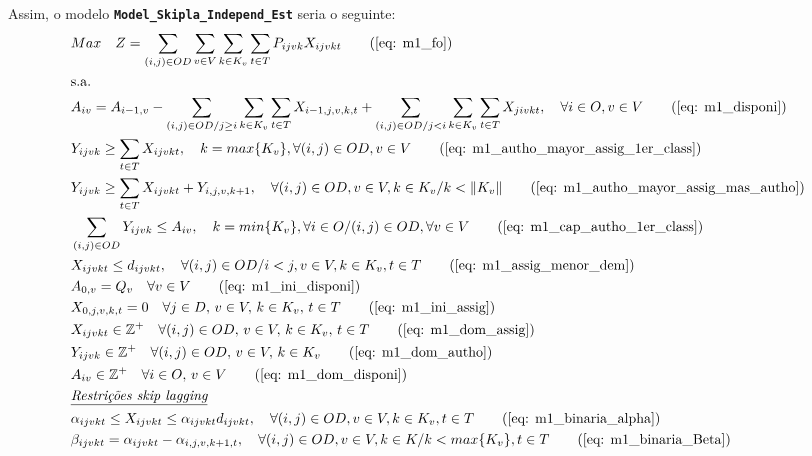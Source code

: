 Assim, o modelo \textbf{ \texttt{Model\_Skipla\_Independ\_Est}} seria o seguinte:
\allowdisplaybreaks
\begin{align}
	& Max \quad Z = \sum_{(i,j)\in OD} \sum_{v\in V} \sum_{k\in K_v} \sum_{t\in T} P_{ijvk} X_{ijvkt}     \tag{\ref{eq: m1_fo}}   \\
	& \text{s.a.}  \notag \\
	& A_{iv} = A_{i-1,v} - \sum_{(i,j) \in OD/j \geq i} \sum_{k\in K_v}\sum_{t\in T}X_{i-1,j,v,k,t} + \sum_{(i,j) \in OD/j<i} \sum_{k\in K_v}\sum_{t\in T}X_{jivkt}, \quad \forall i \in O, v \in V   \tag{\ref{eq: m1_disponi}} \\
	& Y_{ijvk} \geq  \sum_{t \in T} X_{ijvkt},  \quad k = max\{K_v\}, \forall(i,j) \in OD ,v \in V     \tag{\ref{eq: m1_autho_mayor_assig_1er_class}} \\
	& Y_{ijvk} \geq  \sum_{t \in T} X_{ijvkt} + Y_{i,j,v,k + 1} , \quad \forall(i,j) \in OD, v \in V, k \in K_v / k < \lVert K_v \rVert   \tag{\ref{eq: m1_autho_mayor_assig_mas_autho}} \\
	& \sum_{(i,j) \in OD} Y_{ijvk} \leq A_{iv}, \quad  k = min\{K_v\}, \forall i \in O / (i,j) \in OD,   \forall v \in V       \tag{\ref{eq: m1_cap_autho_1er_class}} \\
	& X_{ijvkt} \leq d_{ijvkt},  \quad \forall (i,j) \in OD / i < j  ,v \in V, k \in K_v, t\in T   \tag{\ref{eq: m1_assig_menor_dem}} \\
	& A_{0,v} = Q_v \quad \forall v \in V  \tag{\ref{eq: m1_ini_disponi}} \\ 
	& X_{0,j,v,k,t} = 0 \quad \forall j \in D,\, v \in V,\, k \in K_v,\, t \in T  \tag{\ref{eq: m1_ini_assig}} \\ 
	& X_{ijvkt} \in \mathbb{Z}^+ \quad \forall(i,j) \in OD,\, v \in V,\, k \in K_v,\, t \in T  \tag{\ref{eq: m1_dom_assig}} \\ 
	& Y_{ijvk} \in \mathbb{Z}^+ \quad \forall(i,j) \in OD,\, v \in V,\, k \in K_v  \tag{\ref{eq: m1_dom_autho}} \\ 
	& A_{iv} \in \mathbb{Z}^+ \quad \forall i \in O,\, v \in V  \tag{\ref{eq: m1_dom_disponi}} \\
	& \textit{\underline{Restrições skip lagging}}         \notag   \\
	& \alpha_{ijvkt} \leq X_{ijvkt} \leq \alpha_{ijvkt}d_{ijvkt}, \quad   \forall(i,j) \in OD, v \in V, k \in K_v, t \in T   \tag{\ref{eq: m1_binaria_alpha}} \\
	& \beta_{ijvkt} = \alpha_{ijvkt} - \alpha_{i,j,v,k+1,t}, \quad \forall (i,j) \in OD, v \in V, k \in K /k < max\{K_v\}, t\in T    \tag{\ref{eq: m1_binaria_Beta}}   \\

\end{align}
